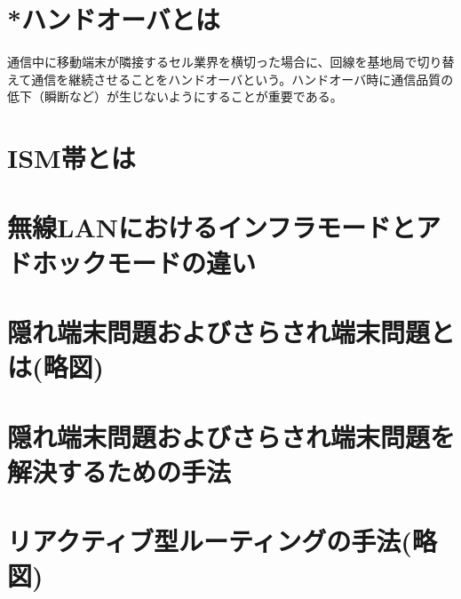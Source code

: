 \documentclass[10.5pt]{jsarticle}
\begin{document}
\section{*ハンドオーバとは}
通信中に移動端末が隣接するセル業界を横切った場合に、回線を基地局で切り替えて通信を継続させることをハンドオーバという。ハンドオーバ時に通信品質の低下（瞬断など）が生じないようにすることが重要である。

\section{ISM帯とは}


\section{無線LANにおけるインフラモードとアドホックモードの違い}


\section{隠れ端末問題およびさらされ端末問題とは(略図)}


\section{隠れ端末問題およびさらされ端末問題を解決するための手法}


\section{リアクティブ型ルーティングの手法(略図)}
\end{document}
